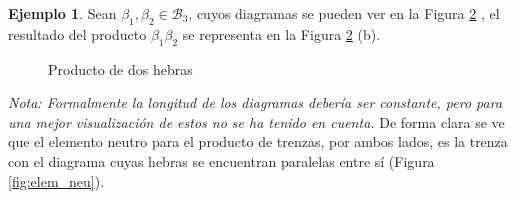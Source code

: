 \documentclass[12pt]{book}
\theoremstyle{definition}
\newtheorem{ejem}{Ejemplo}[section]
\begin{document}
\begin{ejem}
Sean $\beta_1,\beta_2\in \mathcal{B}_3$, cuyos diagramas se pueden ver en la Figura \ref{fig:producto_hebras} , el resultado del producto $\beta_1\beta_2$ se representa en la Figura \ref{fig:producto_hebras} (b).
\begin{figure}[h!]
\centering
	\begin{subfigure}[b]{0.45\linewidth}
		\begin{center}
		\end{center}
		
		\caption{}
		\label{subfig:factores}
	\end{subfigure}
	\begin{subfigure}[b]{0.45\linewidth}
		\begin{center}
		\end{center}
		\caption{}
	\end{subfigure}
	\caption{Producto de dos hebras}
	\label{fig:producto_hebras}
\end{figure}
\end{ejem}








\textit{Nota: Formalmente la longitud de los diagramas debería ser constante, pero para una mejor visualización de estos no se ha tenido en cuenta.}
\newline
\newline
De forma clara se ve que el elemento neutro para el producto de trenzas, por ambos lados, es la trenza con el diagrama cuyas hebras se encuentran paralelas entre sí (Figura \ref{fig:elem_neu}).

\end{document}
